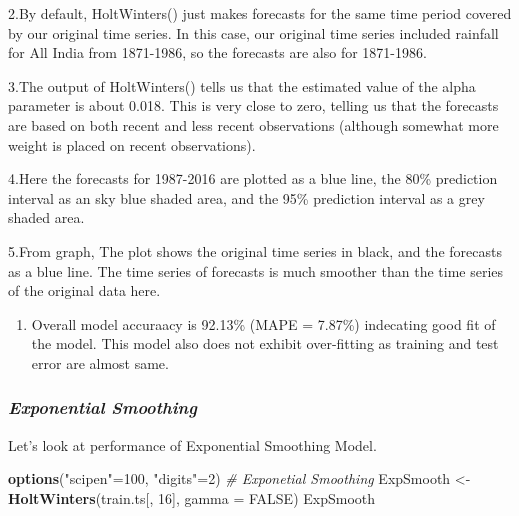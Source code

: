 \documentclass[12pt,openany]{book}
\newenvironment{Shaded}{\begin{snugshade}}{\end{snugshade}}
\newcommand{\CommentTok}[1]{\textcolor[rgb]{0.56,0.35,0.01}{\textit{#1}}}
\newcommand{\DataTypeTok}[1]{\textcolor[rgb]{0.13,0.29,0.53}{#1}}
\newcommand{\DecValTok}[1]{\textcolor[rgb]{0.00,0.00,0.81}{#1}}
\newcommand{\KeywordTok}[1]{\textcolor[rgb]{0.13,0.29,0.53}{\textbf{#1}}}
\newcommand{\NormalTok}[1]{#1}
\newcommand{\OtherTok}[1]{\textcolor[rgb]{0.56,0.35,0.01}{#1}}
\newcommand{\StringTok}[1]{\textcolor[rgb]{0.31,0.60,0.02}{#1}}
\providecommand{\tightlist}{%
  \setlength{\itemsep}{0pt}\setlength{\parskip}{0pt}}
\begin{document}
2.By default, HoltWinters() just makes forecasts for the same time period covered by our original time series. In this case, our original time series included rainfall for All India from 1871-1986, so the forecasts are also for 1871-1986.

3.The output of HoltWinters() tells us that the estimated value of the alpha parameter is about 0.018. This is very close to zero, telling us that the forecasts are based on both recent and less recent observations (although somewhat more weight is placed on recent observations).

4.Here the forecasts for 1987-2016 are plotted as a blue line, the 80\% prediction interval as an sky blue shaded area, and the 95\% prediction interval as a grey shaded area.

5.From graph, The plot shows the original time series in black, and the forecasts as a blue line. The time series of forecasts is much smoother than the time series of the original data here.

\begin{enumerate}
\def\labelenumi{\arabic{enumi}.}
\setcounter{enumi}{5}
\tightlist
\item
  Overall model accuraacy is 92.13\% (MAPE = 7.87\%) indecating good fit of the model. This model also does not exhibit over-fitting as training and test error are almost same.
\end{enumerate}

\hypertarget{exponential-smoothing-1}{%
\subsubsection{\texorpdfstring{\emph{\textbf{\emph{Exponential Smoothing}}}}{Exponential Smoothing}}\label{exponential-smoothing-1}}

Let's look at performance of Exponential Smoothing Model.

\begin{Shaded}
\begin{Highlighting}[]
\KeywordTok{options}\NormalTok{(}\StringTok{"scipen"}\NormalTok{=}\DecValTok{100}\NormalTok{, }\StringTok{"digits"}\NormalTok{=}\DecValTok{2}\NormalTok{)}
\CommentTok{# Exponetial Smoothing}
\NormalTok{ExpSmooth <-}\StringTok{ }\KeywordTok{HoltWinters}\NormalTok{(train.ts[, }\DecValTok{16}\NormalTok{], }\DataTypeTok{gamma =} \OtherTok{FALSE}\NormalTok{)}
\NormalTok{ExpSmooth}
\end{Highlighting}
\end{Shaded}
\end{document}
